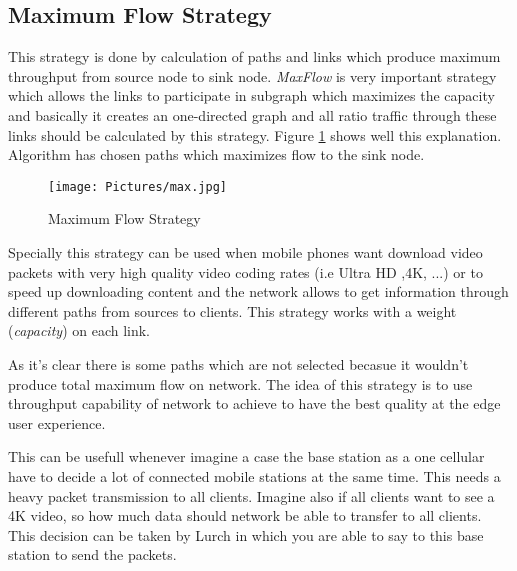\subsection{Maximum Flow Strategy}
This strategy is done by calculation of paths and links which produce maximum throughput from source node to sink node. \textit{MaxFlow} is very important strategy which allows the links to participate in subgraph which maximizes the capacity and basically it creates an one-directed graph and all ratio traffic through these links should be calculated by this strategy. Figure \ref{max} shows well this explanation. Algorithm has chosen paths which maximizes flow to the sink node.

\begin{figure}[H]

\begin{center}

\texttt{[image: Pictures/max.jpg]}

\caption{Maximum Flow Strategy} \label{max} 

\end{center}

\end{figure}


 
Specially this strategy can be used when mobile phones want download video packets with very high quality video coding rates (i.e Ultra HD ,4K, ...) or to speed up downloading content and the network allows to get information through different paths from sources to clients. This strategy works with a weight (\textit{capacity}) on each link.

As it's clear there is some paths which are not selected becasue it wouldn't produce total maximum flow on network.  The idea of this strategy is to use throughput capability of network to achieve to have the best quality at the edge user experience. 

This can be usefull whenever imagine a case the base station as a one cellular have to decide a lot of connected mobile stations at the same time. This needs a heavy packet transmission to all clients. Imagine also if all clients want to see a 4K video, so how much data should network be able to transfer to all clients. This decision can be taken by Lurch in which you are able to say to this base station to send the packets.

 





